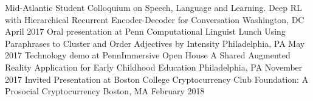\begin{cventries}
    \cventrynobullet
        {Mid-Atlantic Student Colloquium on Speech, Language and Learning.}
        {Deep RL with Hierarchical Recurrent Encoder-Decoder for Conversation}
        {Washington, DC}
        {April 2017}
        {}
    \cventrynobullet
        {Oral presentation at Penn Computational Linguist Lunch}
        {Using Paraphrases to Cluster and Order Adjectives by Intensity}
        {Philadelphia, PA}
        {May 2017}
        {}
    \cventrynobullet
        {Technology demo at PennImmersive Open House}
        {A Shared Augmented Reality Application for Early Childhood Education}
        {Philadelphia, PA}
        {November 2017}
        {}
    \cventrynobullet
        {Invited Presentation at Boston College Cryptocurrency Club}
        {Foundation: A Prosocial Cryptocurrency}
        {Boston, MA}
        {February 2018}
        {}
 \end{cventries}
